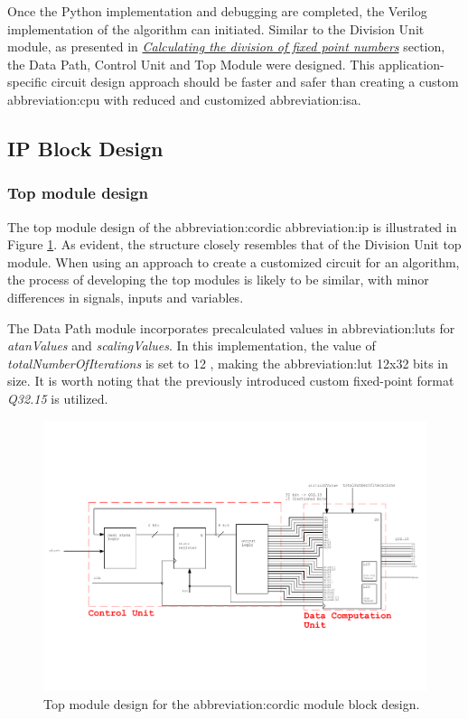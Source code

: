 \documentclass[a4paper, twoside, 11pt]{article}
\newcommand{\fbar}{\FloatBarrier}
\begin{document}
\par
Once the Python implementation and debugging are completed, the Verilog implementation of the algorithm can initiated. Similar to the Division Unit module, as presented in \hyperref[sec:calculating-the-division-of-fixed-point-numbers]{\textit{Calculating the division of fixed point numbers}} section, the Data Path, Control Unit and Top Module were designed. This application-specific circuit design approach should be faster and safer than creating a custom \gls{abbreviation:cpu} with reduced and customized \gls{abbreviation:isa}.

    \fbar
    \subsection{IP Block Design}
    \fbar
        \subsubsection{Top module design}
            The top module design of the \gls{abbreviation:cordic} \gls{abbreviation:ip} is illustrated in Figure \ref{fig:cordic-top-module}. As evident, the structure closely resembles that of the Division Unit top module. When using an approach to create a customized circuit for an algorithm, the process of developing the top modules is likely to be similar, with minor differences in signals, inputs and variables.\par
            The Data Path module incorporates precalculated values in \gls{abbreviation:lut}s for \textit{atanValues} and \textit{scalingValues}. In this implementation, the value of \textit{totalNumberOfIterations} is set to 12 , making the \gls{abbreviation:lut} 12x32 bits in size. It is worth noting that the previously introduced custom fixed-point format \textit{Q32.15} is utilized.
            \begin{figure}[htbp!]
                \centering
                \includegraphics[width=1\textwidth]{src/pdf/cordic-top-module.pdf}
                \caption{Top module design for the \gls{abbreviation:cordic} module block design.}
                \label{fig:cordic-top-module}
            \end{figure}
        \fbar
\end{document}
